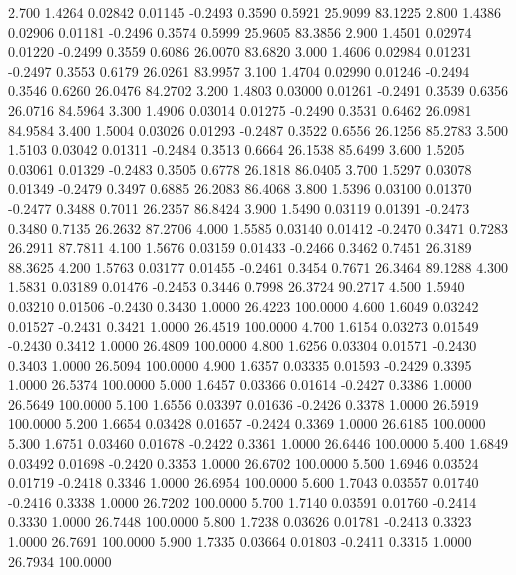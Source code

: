    2.700   1.4264   0.02842   0.01145  -0.2493   0.3590   0.5921  25.9099  83.1225
   2.800   1.4386   0.02906   0.01181  -0.2496   0.3574   0.5999  25.9605  83.3856
   2.900   1.4501   0.02974   0.01220  -0.2499   0.3559   0.6086  26.0070  83.6820
   3.000   1.4606   0.02984   0.01231  -0.2497   0.3553   0.6179  26.0261  83.9957
   3.100   1.4704   0.02990   0.01246  -0.2494   0.3546   0.6260  26.0476  84.2702
   3.200   1.4803   0.03000   0.01261  -0.2491   0.3539   0.6356  26.0716  84.5964
   3.300   1.4906   0.03014   0.01275  -0.2490   0.3531   0.6462  26.0981  84.9584
   3.400   1.5004   0.03026   0.01293  -0.2487   0.3522   0.6556  26.1256  85.2783
   3.500   1.5103   0.03042   0.01311  -0.2484   0.3513   0.6664  26.1538  85.6499
   3.600   1.5205   0.03061   0.01329  -0.2483   0.3505   0.6778  26.1818  86.0405
   3.700   1.5297   0.03078   0.01349  -0.2479   0.3497   0.6885  26.2083  86.4068
   3.800   1.5396   0.03100   0.01370  -0.2477   0.3488   0.7011  26.2357  86.8424
   3.900   1.5490   0.03119   0.01391  -0.2473   0.3480   0.7135  26.2632  87.2706
   4.000   1.5585   0.03140   0.01412  -0.2470   0.3471   0.7283  26.2911  87.7811
   4.100   1.5676   0.03159   0.01433  -0.2466   0.3462   0.7451  26.3189  88.3625
   4.200   1.5763   0.03177   0.01455  -0.2461   0.3454   0.7671  26.3464  89.1288
   4.300   1.5831   0.03189   0.01476  -0.2453   0.3446   0.7998  26.3724  90.2717
   4.500   1.5940   0.03210   0.01506  -0.2430   0.3430   1.0000  26.4223 100.0000
   4.600   1.6049   0.03242   0.01527  -0.2431   0.3421   1.0000  26.4519 100.0000
   4.700   1.6154   0.03273   0.01549  -0.2430   0.3412   1.0000  26.4809 100.0000
   4.800   1.6256   0.03304   0.01571  -0.2430   0.3403   1.0000  26.5094 100.0000
   4.900   1.6357   0.03335   0.01593  -0.2429   0.3395   1.0000  26.5374 100.0000
   5.000   1.6457   0.03366   0.01614  -0.2427   0.3386   1.0000  26.5649 100.0000
   5.100   1.6556   0.03397   0.01636  -0.2426   0.3378   1.0000  26.5919 100.0000
   5.200   1.6654   0.03428   0.01657  -0.2424   0.3369   1.0000  26.6185 100.0000
   5.300   1.6751   0.03460   0.01678  -0.2422   0.3361   1.0000  26.6446 100.0000
   5.400   1.6849   0.03492   0.01698  -0.2420   0.3353   1.0000  26.6702 100.0000
   5.500   1.6946   0.03524   0.01719  -0.2418   0.3346   1.0000  26.6954 100.0000
   5.600   1.7043   0.03557   0.01740  -0.2416   0.3338   1.0000  26.7202 100.0000
   5.700   1.7140   0.03591   0.01760  -0.2414   0.3330   1.0000  26.7448 100.0000
   5.800   1.7238   0.03626   0.01781  -0.2413   0.3323   1.0000  26.7691 100.0000
   5.900   1.7335   0.03664   0.01803  -0.2411   0.3315   1.0000  26.7934 100.0000
